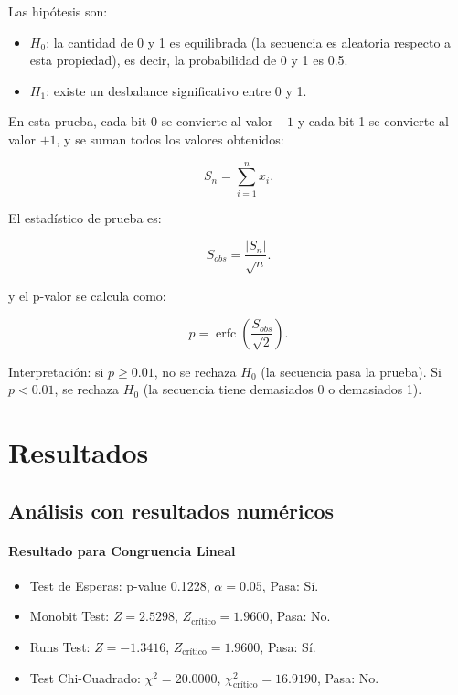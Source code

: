 \documentclass{article}
\begin{document}
Las hipótesis son:

\begin{itemize}
  \item $H_0$: la cantidad de 0 y 1 es equilibrada (la secuencia es aleatoria respecto a esta propiedad), es decir, la probabilidad de 0 y 1 es 0.5.
  \item $H_1$: existe un desbalance significativo entre 0 y 1.
\end{itemize}

En esta prueba, cada bit 0 se convierte al valor $-1$ y cada bit 1 se convierte al valor $+1$, y se suman todos los valores obtenidos:

\begin{equation}
S_n = \sum_{i=1}^{n} x_i.
\end{equation}

El estadístico de prueba es:

\begin{equation}
S_{obs} = \frac{|S_n|}{\sqrt{n}}.
\end{equation}

y el p-valor se calcula como:

\begin{equation}
p = \operatorname{erfc}\left(\frac{S_{obs}}{\sqrt{2}}\right).
\end{equation}

Interpretación: si $p \ge 0.01$, no se rechaza $H_0$ (la secuencia pasa la prueba). Si $p < 0.01$, se rechaza $H_0$ (la secuencia tiene demasiados 0 o demasiados 1).



\section{Resultados}
\label{sec:resultados}

\subsection{Análisis con resultados numéricos}

\paragraph{Resultado para Congruencia Lineal}

\begin{itemize}
  \item Test de Esperas: p-value 0.1228, $\alpha = 0.05$, Pasa: Sí.
  \item Monobit Test: $Z = 2.5298$, $Z_{\text{crítico}} = 1.9600$, Pasa: No.
  \item Runs Test: $Z = -1.3416$, $Z_{\text{crítico}} = 1.9600$, Pasa: Sí.
  \item Test Chi-Cuadrado: $\chi^2 = 20.0000$, $\chi^2_{\text{crítico}} = 16.9190$, Pasa: No.
\end{itemize}
\end{document}
